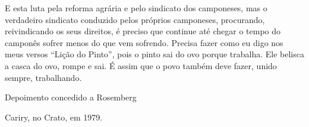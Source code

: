 E esta luta pela reforma agrária e pelo sindicato dos camponeses, mas o
verdadeiro sindicato conduzido pelos próprios camponeses, procurando,
reivindicando os seus direitos, é preciso que continue até chegar o
tempo do camponês sofrer menos do que vem sofrendo. Precisa fazer como
eu digo nos meus versos ``Lição do Pinto'', pois o pinto sai do ovo
porque trabalha. Ele belisca a casca do ovo, rompe e sai. É assim que o
povo também deve fazer, unido sempre, trabalhando.

\hfill{}Depoimento concedido a Rosemberg

\hfill{}Cariry, no Crato, em 1979.